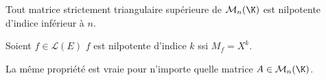 \begin{prop}
    Tout matrice strictement triangulaire supérieure de $\mathcal{M}_n(\K)$ est nilpotente d'indice inférieur à $n$. 
\end{prop}

\begin{prop}
    Soient $f \in \mathcal{L}(E)$ $f$ est nilpotente d'indice $k$ ssi $M_f = X^k$. 

    \vspace{0.3cm}

    La même propriété est vraie pour n'importe quelle matrice $A \in \mathcal{M}_n(\K)$. 
\end{prop}




